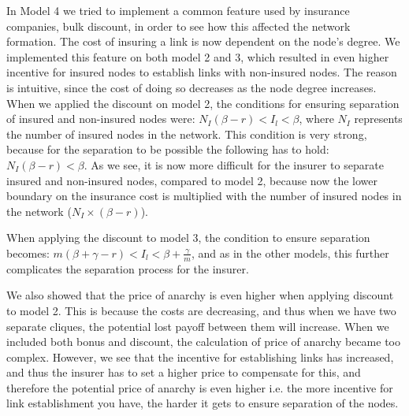 In Model 4 we tried to implement a common feature used by insurance companies, bulk discount, in order to see how this affected the network formation. The cost of insuring a link is now dependent on the node's degree. 
We implemented this feature on both model 2 and 3, which resulted in even higher incentive for insured nodes to establish links with non-insured nodes. The reason is intuitive, since the cost of doing so decreases as the node degree increases. 
When we applied the discount on model 2, the conditions for ensuring separation of insured and non-insured nodes were: $N_{I}(\beta-r)<I_{l}<\beta$, where $N_{I}$ represents the number of insured nodes in the network. This condition is very strong, because for the separation to be possible the following has to hold: $N_{I}(\beta-r)<\beta$. As we see, it is now more difficult for the insurer to separate insured and non-insured nodes, compared to model 2, because now the lower boundary on the insurance cost is multiplied with the number of insured nodes in the network ($N_{I}\times(\beta-r)$).

When applying the discount to model 3, the condition to ensure separation becomes: $m(\beta+\gamma-r)<I_{l}<\beta+\frac{\gamma}{m}$, and as in the other models, this further complicates the separation process for the insurer. 

We also showed that the price of anarchy is even higher when applying discount to model 2. This is because the costs are decreasing, and thus when we have two separate cliques, the potential lost payoff between them will increase.
When we included both bonus and discount, the calculation of price of anarchy became too complex. However, we see that the incentive for establishing links has increased, and thus the insurer has to set a higher price to compensate for this, and therefore the potential price of anarchy is even higher i.e. the more incentive for link establishment you have, the harder it gets to ensure separation of the nodes.  

